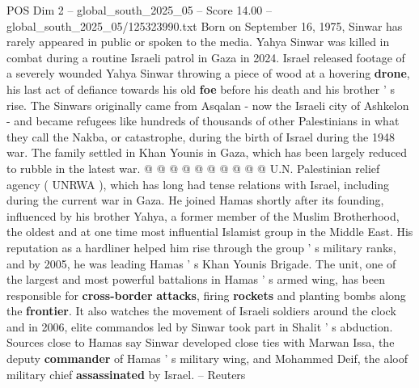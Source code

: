 \begin{textsample}{POS Dim 2 – global\_south\_2025\_05 – Score 14.00 – global\_south\_2025\_05/125323990.txt}
Born on September 16, 1975, Sinwar has rarely appeared in public or spoken to the media.
Yahya Sinwar was killed in combat during a routine Israeli patrol in Gaza in 2024.
Israel released footage of a severely wounded Yahya Sinwar throwing a piece of wood at a hovering \textbf{drone}, his last act of defiance towards his old \textbf{foe} before his death and his brother ' s rise.
The Sinwars originally came from Asqalan - now the Israeli city of Ashkelon - and became refugees like hundreds of thousands of other Palestinians in what they call the Nakba, or catastrophe, during the birth of Israel during the 1948 war.
The family settled in Khan Younis in Gaza, which has been largely reduced to rubble in the latest war. @ @ @ @ @ @ @ @ @ @ U.N.
Palestinian relief agency ( UNRWA ), which has long had tense relations with Israel, including during the current war in Gaza.
He joined Hamas shortly after its founding, influenced by his brother Yahya, a former member of the Muslim Brotherhood, the oldest and at one time most influential Islamist group in the Middle East.
His reputation as a hardliner helped him rise through the group ' s military ranks, and by 2005, he was leading Hamas ' s Khan Younis Brigade.
The unit, one of the largest and most powerful battalions in Hamas ' s armed wing, has been responsible for \textbf{cross-border} \textbf{attacks}, firing \textbf{rockets} and planting bombs along the \textbf{frontier}.
It also watches the movement of Israeli soldiers around the clock and in 2006, elite commandos led by Sinwar took part in Shalit ' s abduction.
Sources close to Hamas say Sinwar developed close ties with Marwan Issa, the deputy \textbf{commander} of Hamas ' s military wing, and Mohammed Deif, the aloof military chief \textbf{assassinated} by Israel. -- Reuters

\end{textsample}
